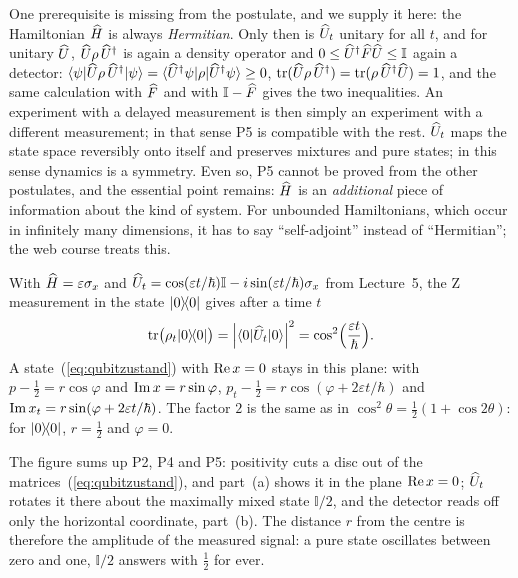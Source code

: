 One prerequisite is missing from the postulate, and we supply it here: the Hamiltonian $\widehat{H}$ is always \emph{Hermitian}. Only then is $\widehat{U}_t$ unitary for all $t$, and for unitary $\widehat{U}$, $\widehat{U}\rho\,\widehat{U}^{\dagger}$ is again a density operator and $0\leq\widehat{U}^{\dagger}\widehat{F}\widehat{U}\leq\mathbb{I}$ again a detector: $\langle \psi \rvert \widehat{U}\rho\,\widehat{U}^{\dagger} \lvert \psi \rangle = \langle \widehat{U}^{\dagger}\psi \rvert \rho \lvert \widehat{U}^{\dagger}\psi \rangle\geq 0$, $\operatorname{tr}(\widehat{U}\rho\,\widehat{U}^{\dagger}) = \operatorname{tr}(\rho\,\widehat{U}^{\dagger}\widehat{U}) = 1$, and the same calculation with $\widehat{F}$ and with $\mathbb{I}-\widehat{F}$ gives the two inequalities. An experiment with a delayed measurement is then simply an experiment with a different measurement; in that sense P5 is compatible with the rest. $\widehat{U}_t$ maps the state space reversibly onto itself and preserves mixtures and pure states; in this sense dynamics is a symmetry. Even so, P5 cannot be proved from the other postulates, and the essential point remains: $\widehat{H}$ is an \emph{additional} piece of information about the kind of system. For unbounded Hamiltonians, which occur in infinitely many dimensions, it has to say ``self-adjoint'' instead of ``Hermitian''; the web course treats this.

\begin{example}
With $\widehat{H} = \varepsilon\sigma_{x}$ and $\widehat{U}_t = \cos(\varepsilon t/\hbar)\mathbb{I} - i\sin(\varepsilon t/\hbar)\sigma_{x}$ from Lecture~5, the Z measurement in the state $\lvert 0 \rangle\!\langle 0 \rvert$ gives after a time $t$
\begin{equation}
	\operatorname{tr}\bigl(\rho_t\lvert 0 \rangle\!\langle 0 \rvert\bigr) = \left\lvert \langle 0 \rvert \widehat{U}_t \lvert 0 \rangle \right\rvert^2 = \cos^2\Bigl(\frac{\varepsilon t}{\hbar}\Bigr).
\end{equation}
A state~(\ref{eq:qubitzustand}) with $\operatorname{Re} x = 0$ stays in this plane: with $p-\tfrac12 = r\cos\varphi$ and $\operatorname{Im} x = r\sin\varphi$, $p_t - \tfrac12 = r\cos(\varphi + 2\varepsilon t/\hbar)$ and $\operatorname{Im} x_t = r\sin(\varphi + 2\varepsilon t/\hbar)$. The factor $2$ is the same as in $\cos^2\theta = \tfrac12(1 + \cos 2\theta)$: for $\lvert 0 \rangle\!\langle 0 \rvert$, $r = \tfrac12$ and $\varphi = 0$.
\end{example}



The figure sums up P2, P4 and P5: positivity cuts a disc out of the matrices~(\ref{eq:qubitzustand}), and part~(a) shows it in the plane $\operatorname{Re} x = 0$; $\widehat{U}_t$ rotates it there about the maximally mixed state $\mathbb{I}/2$, and the detector reads off only the horizontal coordinate, part~(b). The distance $r$ from the centre is therefore the amplitude of the measured signal: a pure state oscillates between zero and one, $\mathbb{I}/2$ answers with $\tfrac12$ for ever.

